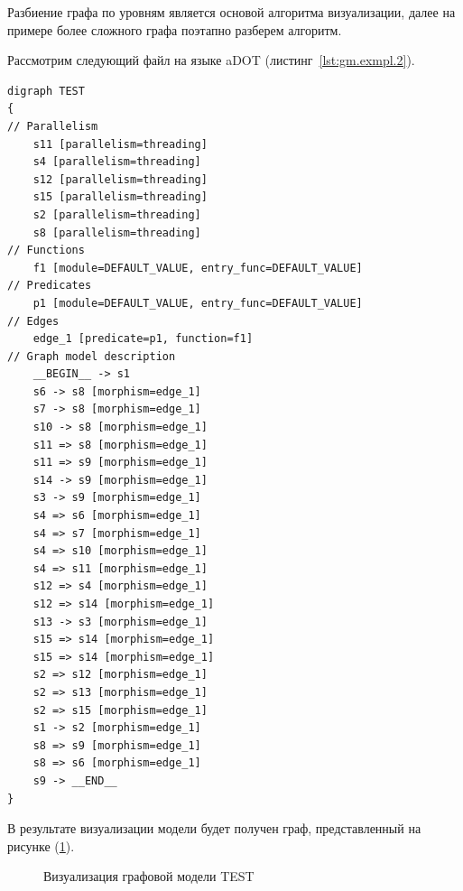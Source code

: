 Разбиение графа по уровням является основой алгоритма визуализации, далее на примере более сложного графа поэтапно разберем алгоритм.

Рассмотрим следующий файл на языке aDOT (листинг~\ref{lst:gm.exmpl.2}).

\begin{lstlisting}[frame=single, label={lst:gm.exmpl.2}, caption={Пример aDOT-определения графовой модели \textsf{TEST}}, language=aDOTExample]
digraph TEST
{
// Parallelism
	s11 [parallelism=threading]
	s4 [parallelism=threading]
	s12 [parallelism=threading]
	s15 [parallelism=threading]
	s2 [parallelism=threading]
	s8 [parallelism=threading]
// Functions
	f1 [module=DEFAULT_VALUE, entry_func=DEFAULT_VALUE]
// Predicates
	p1 [module=DEFAULT_VALUE, entry_func=DEFAULT_VALUE]
// Edges
	edge_1 [predicate=p1, function=f1]
// Graph model description
	__BEGIN__ -> s1
	s6 -> s8 [morphism=edge_1]
	s7 -> s8 [morphism=edge_1]
	s10 -> s8 [morphism=edge_1]
	s11 => s8 [morphism=edge_1]
	s11 => s9 [morphism=edge_1]
	s14 -> s9 [morphism=edge_1]
	s3 -> s9 [morphism=edge_1]
	s4 => s6 [morphism=edge_1]
	s4 => s7 [morphism=edge_1]
	s4 => s10 [morphism=edge_1]
	s4 => s11 [morphism=edge_1]
	s12 => s4 [morphism=edge_1]
	s12 => s14 [morphism=edge_1]
	s13 -> s3 [morphism=edge_1]
	s15 => s14 [morphism=edge_1]
	s15 => s14 [morphism=edge_1]
	s2 => s12 [morphism=edge_1]
	s2 => s13 [morphism=edge_1]
	s2 => s15 [morphism=edge_1]
	s1 -> s2 [morphism=edge_1]
	s8 => s9 [morphism=edge_1]
	s8 => s6 [morphism=edge_1]
	s9 -> __END__ 
}
\end{lstlisting}

В результате визуализации модели будет получен граф, представленный на рисунке (\ref{fig:main_graph}).

\begin{figure}[ht!]
\caption{Визуализация графовой модели \textsf{TEST}}
\label{fig:main_graph}
\end{figure}

